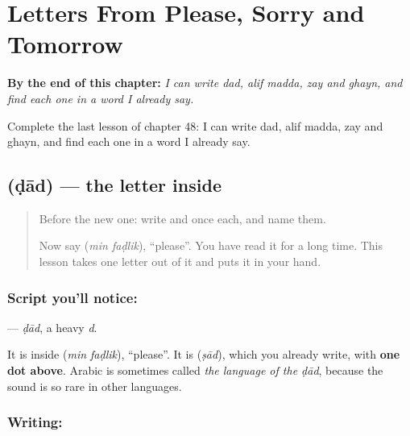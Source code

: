 
\chapter{Letters From Please, Sorry and Tomorrow}
\label{ch:ar-letters-from-please-and-sorry}

\begin{chapteropening}
\textbf{By the end of this chapter:} \emph{I can write dad, alif madda, zay and ghayn, and find each one in a word I already say.}

Complete the last lesson of chapter 48: I can write dad, alif madda, zay and ghayn, and find each one in a word I already say.
\end{chapteropening}

\section[\texorpdfstring{\ar{ض} (ḍād)}{ض (ḍād)}]{ (ḍād) — the letter inside }

\label{lesson:AR-W48-dad}



\begin{quote}
Before the new one: write  and  once each, and name them.

Now say \textbf{ } (\emph{min faḍlik}), \textquotedblleft{}please\textquotedblright{}. You have read it for a long time. This lesson takes one letter out of it and puts it in your hand.
\end{quote}

\subsection*{Script you'll notice: }
\textbf{} — \emph{ḍād}, a heavy \emph{d}.

It is inside \textbf{ } (\emph{min faḍlik}), \textquotedblleft{}please\textquotedblright{}. It is \textbf{} (\emph{ṣād}), which you already write, with \textbf{one dot above}. Arabic is sometimes called \emph{the language of the ḍād}, because the sound is so rare in other languages.

\subsection*{Writing: }

